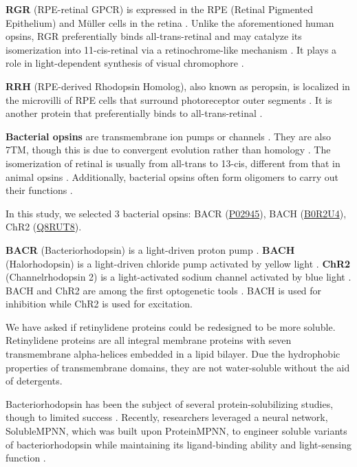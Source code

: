 \documentclass[fleqn,10pt,lineno]{manuscript}
\begin{document}
\textbf{RGR} (RPE-retinal GPCR) is expressed in the RPE (Retinal Pigmented Epithelium) and M\"uller cells in the retina \citep{Shen_1994}. Unlike the aforementioned human opsins, RGR preferentially binds all-trans-retinal and may catalyze its isomerization into 11-cis-retinal via a retinochrome-like mechanism \citep{Radu_2008}. It plays a role in light-dependent synthesis of visual chromophore \citep{Radu_2008}.

\textbf{RRH} (RPE-derived Rhodopsin Homolog), also known as peropsin, is localized in the microvilli of RPE cells that surround photoreceptor outer segments \citep{Sun_1997}. It is another protein that preferentially binds to all-trans-retinal \citep{Cook_2017}. 

\textbf{Bacterial opsins} are transmembrane ion pumps or channels \citep{Findlay_1986, Zhang_2011}. They are also 7TM, though this is due to convergent evolution rather than homology \citep{Yee_2013}. The isomerization of retinal is usually from all-trans to 13-cis, different from that in animal opsins \citep{Findlay_1986, Spudich_2000}. Additionally, bacterial opsins often form oligomers to carry out their functions \citep{Taguchi_2023, Gmelin_2007, Shan_2024}.

In this study, we selected 3 bacterial opsins: BACR (\href{https://www.uniprot.org/uniprotkb/P02945/entry}{P02945}), BACH (\href{https://www.uniprot.org/uniprotkb/B0R2U4/entry}{B0R2U4}), ChR2 (\href{https://www.uniprot.org/uniprotkb/Q8RUT8/entry}{Q8RUT8}). 

\textbf{BACR} (Bacteriorhodopsin) is a light-driven proton pump \citep{Oesterhelt_1971}. \textbf{BACH} (Halorhodopsin) is a light-driven chloride pump activated by yellow light \citep{Schobert_1982}. \textbf{ChR2} (Channelrhodopsin 2) is a light-activated sodium channel activated by blue light \citep{Nagel_2003}. BACH and ChR2 are among the first optogenetic tools \citep{Zhang_2007, Han_2007}. BACH is used for inhibition while ChR2 is used for excitation. 

We have asked if retinylidene proteins could be redesigned to be more soluble. Retinylidene proteins are all integral membrane proteins with seven transmembrane alpha-helices embedded in a lipid bilayer. Due the hydrophobic properties of transmembrane domains, they are not water-soluble without the aid of detergents. 

Bacteriorhodopsin has been the subject of several protein-solubilizing studies, though to limited success \citep{Sirokman_1993, Gibas_1997, Mitra_2002}. Recently, researchers leveraged a neural network, SolubleMPNN, which was built upon ProteinMPNN, to engineer soluble variants of bacteriorhodopsin while maintaining its ligand-binding ability and light-sensing function \citep{Nikolaev_2024}.
\end{document}
